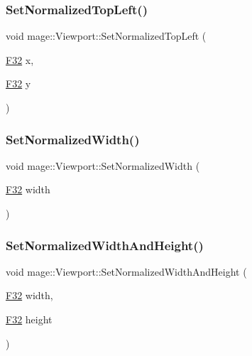 \hypertarget{structmage_1_1_viewport_a6f85757d3b7e09e9e7cb72c201fd0cd4}{}\label{structmage_1_1_viewport_a6f85757d3b7e09e9e7cb72c201fd0cd4} 
\subsubsection{\texorpdfstring{Set\+Normalized\+Top\+Left()}{SetNormalizedTopLeft()}}
{\footnotesize\ttfamily void mage\+::\+Viewport\+::\+Set\+Normalized\+Top\+Left (\begin{DoxyParamCaption}\item[{\hyperlink{namespacemage_aa97e833b45f06d60a0a9c4fc22ae02c0}{F32}}]{x,  }\item[{\hyperlink{namespacemage_aa97e833b45f06d60a0a9c4fc22ae02c0}{F32}}]{y }\end{DoxyParamCaption})\hspace{0.3cm}{\ttfamily [noexcept]}}

\hypertarget{structmage_1_1_viewport_af79a62d7996eb67cf9be99e3e7258f6a}{}\label{structmage_1_1_viewport_af79a62d7996eb67cf9be99e3e7258f6a} 
\subsubsection{\texorpdfstring{Set\+Normalized\+Width()}{SetNormalizedWidth()}}
{\footnotesize\ttfamily void mage\+::\+Viewport\+::\+Set\+Normalized\+Width (\begin{DoxyParamCaption}\item[{\hyperlink{namespacemage_aa97e833b45f06d60a0a9c4fc22ae02c0}{F32}}]{width }\end{DoxyParamCaption})\hspace{0.3cm}{\ttfamily [noexcept]}}

\hypertarget{structmage_1_1_viewport_ae456cd1a570d41bff6939d29722fa8ca}{}\label{structmage_1_1_viewport_ae456cd1a570d41bff6939d29722fa8ca} 
\subsubsection{\texorpdfstring{Set\+Normalized\+Width\+And\+Height()}{SetNormalizedWidthAndHeight()}}
{\footnotesize\ttfamily void mage\+::\+Viewport\+::\+Set\+Normalized\+Width\+And\+Height (\begin{DoxyParamCaption}\item[{\hyperlink{namespacemage_aa97e833b45f06d60a0a9c4fc22ae02c0}{F32}}]{width,  }\item[{\hyperlink{namespacemage_aa97e833b45f06d60a0a9c4fc22ae02c0}{F32}}]{height }\end{DoxyParamCaption})\hspace{0.3cm}{\ttfamily [noexcept]}}

